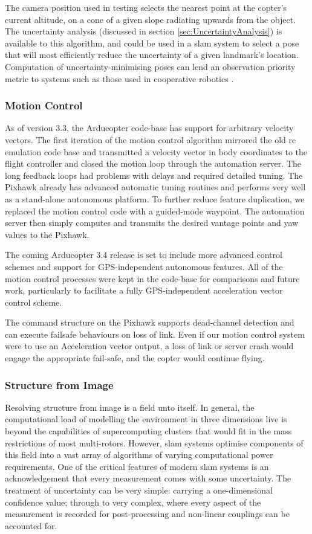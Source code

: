 \documentclass[a4paper, 11pt, titlepage]{article}
\begin{document}
      The camera position used in testing selects the nearest point at the copter's current altitude, on a cone of a given slope radiating upwards from the object.
      The uncertainty analysis (discussed in section \ref{sec:UncertaintyAnalysis}) is available to this algorithm, and could be used in a \gls{slam} system to select a pose that will most efficiently reduce the uncertainty of a given landmark's location.  Computation of uncertainty-minimising poses can lend an observation priority metric to systems such as those used in cooperative robotics \cite{TrilatUnderwater}.

    \subsubsection{Motion Control}
      As of version 3.3, the Arducopter code-base has support for arbitrary velocity vectors.  The first iteration of the motion control algorithm mirrored the old \gls{rc} emulation code base and transmitted a velocity vector in body coordinates to the flight controller and closed the motion loop through the automation server.  The long feedback loops had problems with delays and required detailed tuning.
      The Pixhawk already has advanced automatic tuning routines and performs very well as a stand-alone autonomous platform.
      To further reduce feature duplication, we replaced the motion control code with a guided-mode waypoint.  The automation server then simply computes and transmits the desired vantage points and yaw values to the Pixhawk.

      The coming Arducopter 3.4 release is set to include more advanced control schemes and support for GPS-independent autonomous features.  All of the motion control processes were kept in the code-base for comparisons and future work, particularly to facilitate a fully GPS-independent acceleration vector control scheme.

      The command structure on the Pixhawk supports dead-channel detection and can execute failsafe behaviours on loss of link.  Even if our motion control system were to use an Acceleration vector output, a loss of link or server crash would engage the appropriate fail-safe, and the copter would continue flying.

    \subsubsection{Structure from Image}
      Resolving structure from image is a field unto itself.  In general, the computational load of modelling the environment in three dimensions live is beyond the capabilities of supercomputing clusters that would fit in the mass restrictions of most multi-rotors.  However, \gls{slam} systems optimise components of this field into a vast array of algorithms of varying computational power requirements.
      One of the critical features of modern \gls{slam} systems is an acknowledgement that every measurement comes with some uncertainty. 
      The treatment of uncertainty can be very simple: carrying a one-dimensional confidence value; through to very complex, where every aspect of the measurement is recorded for post-processing and non-linear couplings can be accounted for.
\end{document}
